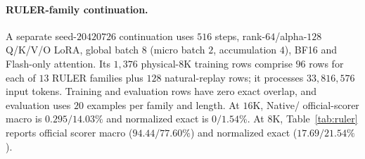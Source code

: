 \paragraph{RULER-family continuation.}
A separate seed-$20420726$ continuation uses $516$ steps, rank-$64$/alpha-$128$
Q/K/V/O LoRA, global batch $8$ (micro batch $2$, accumulation $4$), BF16 and
Flash-only attention. Its $1{,}376$ physical-$8$K training rows comprise $96$
rows for each of $13$ RULER families plus $128$ natural-replay rows; it processes
$33{,}816{,}576$ input tokens. Training and evaluation rows have zero exact
overlap, and evaluation uses $20$ examples per family and length.
At $16$K, Native/\evq{} official-scorer macro is
$0.295/14.03\%$ and normalized exact is $0/1.54\%$. At $8$K,
Table~\ref{tab:ruler} reports official scorer macro ($94.44/77.60\%$) and
normalized exact ($17.69/21.54\%$).

